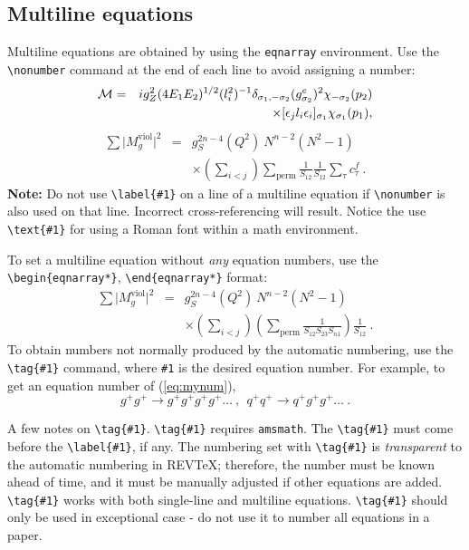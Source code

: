 \documentclass[%
 aip,
 jmp,%
 amsmath,amssymb,
 reprint,%
]{revtex4-1}
\begin{document}
\subsection{Multiline equations}

Multiline equations are obtained by using the \verb+eqnarray+
environment.  Use the \verb+\nonumber+ command at the end of each line
to avoid assigning a number:
\begin{eqnarray}
{\cal M}=&&ig_Z^2(4E_1E_2)^{1/2}(l_i^2)^{-1}
\delta_{\sigma_1,-\sigma_2}
(g_{\sigma_2}^e)^2\chi_{-\sigma_2}(p_2)\nonumber\\
&&\times
[\epsilon_jl_i\epsilon_i]_{\sigma_1}\chi_{\sigma_1}(p_1),
\end{eqnarray}
\begin{eqnarray}
\sum \vert M^{\text{viol}}_g \vert ^2&=&g^{2n-4}_S(Q^2)~N^{n-2}
        (N^2-1)\nonumber \\
 & &\times \left( \sum_{i<j}\right)
  \sum_{\text{perm}}
 \frac{1}{S_{12}}
 \frac{1}{S_{12}}
 \sum_\tau c^f_\tau~.
\end{eqnarray}
\textbf{Note:} Do not use \verb+\label{#1}+ on a line of a multiline
equation if \verb+\nonumber+ is also used on that line. Incorrect
cross-referencing will result. Notice the use \verb+\text{#1}+ for
using a Roman font within a math environment.

To set a multiline equation without \emph{any} equation
numbers, use the \verb+\begin{eqnarray*}+,
\verb+\end{eqnarray*}+ format:
\begin{eqnarray*}
\sum \vert M^{\text{viol}}_g \vert ^2&=&g^{2n-4}_S(Q^2)~N^{n-2}
        (N^2-1)\\
 & &\times \left( \sum_{i<j}\right)
 \left(
  \sum_{\text{perm}}\frac{1}{S_{12}S_{23}S_{n1}}
 \right)
 \frac{1}{S_{12}}~.
\end{eqnarray*}
To obtain numbers not normally produced by the automatic numbering,
use the \verb+\tag{#1}+ command, where \verb+#1+ is the desired
equation number. For example, to get an equation number of
(\ref{eq:mynum}),
\begin{equation}
g^+g^+ \rightarrow g^+g^+g^+g^+ \dots ~,~~q^+q^+\rightarrow
q^+g^+g^+ \dots ~. \tag{2.6$'$}\label{eq:mynum}
\end{equation}

A few notes on \verb=\tag{#1}=. \verb+\tag{#1}+ requires
\texttt{amsmath}. The \verb+\tag{#1}+ must come before the
\verb+\label{#1}+, if any. The numbering set with \verb+\tag{#1}+ is
\textit{transparent} to the automatic numbering in REV\TeX{};
therefore, the number must be known ahead of time, and it must be
manually adjusted if other equations are added. \verb+\tag{#1}+ works
with both single-line and multiline equations. \verb+\tag{#1}+ should
only be used in exceptional case - do not use it to number all
equations in a paper.
\end{document}
